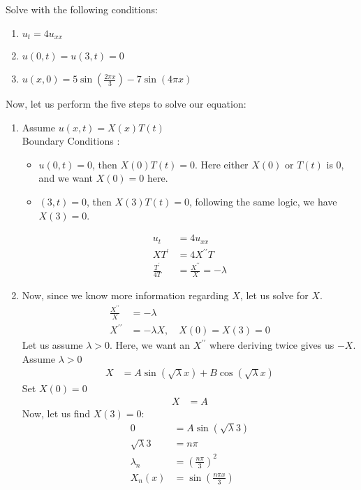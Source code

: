 \ex Solve with the following conditions:
\begin{enumerate}
  \item $u_t = 4u_{xx}$
  \item $u(0, t) = u(3, t) = 0$
  \item $u(x, 0) = 5 \sin \left( \frac{2 \pi x}{3} \right) - 7 \sin(4 \pi x)$
\end{enumerate}
Now, let us perform the five steps to solve our equation:
\begin{enumerate}
  \item Assume $u(x, t) = X(x)T(t)$\\
  Boundary Conditions :
  \begin{itemize}
    \item $u(0, t) = 0$, then $X(0)T(t) = 0$. Here either $X(0)$ or $T(t)$ is $0$, and we want $X(0) = 0$ here.
    \item $(3, t) = 0$, then $X(3)T(t) = 0$, following the same logic, we have $X(3) = 0$.
  \end{itemize}
  \begin{align}
    u_t & = 4u_{xx}\\
    XT^\prime & = 4X^{\prime\prime}T\\
    \frac{T^\prime}{4T} & = \frac{X^{\prime\prime}}{X} = -\lambda
  \end{align}
  \item Now, since we know more information regarding $X$, let us solve for $X$.
  \begin{align}
    \frac{X^{\prime\prime}}{X} & = -\lambda\\
    X^{\prime\prime} & = -\lambda X, \quad X(0) = X(3) = 0
  \end{align}
  Let us assume $\lambda > 0$. Here, we want an $X^{\prime\prime}$ where deriving twice gives us $-X$. Assume $\lambda > 0$
  \begin{align}
    X & = A\sin(\sqrt \lambda x) + B \cos(\sqrt \lambda x)
  \end{align}
  Set $X(0) = 0$
  \begin{align}
    X & = A
  \end{align}
  Now, let us find $X(3) = 0$:
  \begin{align}
    0 & = A\sin(\sqrt \lambda 3)\\
    \sqrt \lambda 3 & = n \pi\\
    \lambda_n & = \left( \frac{n \pi}{3} \right)^2\\
    X_n(x) & = \sin \left(\frac{n \pi x}{3} \right)
  \end{align}

\end{enumerate}
